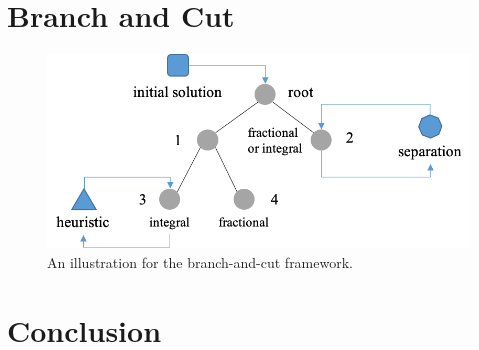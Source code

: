 \documentclass{article}
\begin{document}
\newpage
\section{Branch and Cut}

\begin{figure}[htbp]
	\centering
	\includegraphics[width=0.7\linewidth]{figure/rn-b-a-c-framework}
	\caption{An illustration for the branch-and-cut framework.}
	\label{fig:rn-b-a-c-framework}
\end{figure}


\section{Conclusion}


% 
% 
\end{document}
